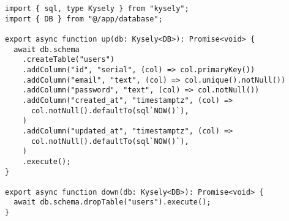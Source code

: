 \begin{verbatim}
import { sql, type Kysely } from "kysely";
import { DB } from "@/app/database";

export async function up(db: Kysely<DB>): Promise<void> {
  await db.schema
    .createTable("users")
    .addColumn("id", "serial", (col) => col.primaryKey())
    .addColumn("email", "text", (col) => col.unique().notNull())
    .addColumn("password", "text", (col) => col.notNull())
    .addColumn("created_at", "timestamptz", (col) =>
      col.notNull().defaultTo(sql`NOW()`),
    )
    .addColumn("updated_at", "timestamptz", (col) =>
      col.notNull().defaultTo(sql`NOW()`),
    )
    .execute();
}

export async function down(db: Kysely<DB>): Promise<void> {
  await db.schema.dropTable("users").execute();
}
\end{verbatim}


